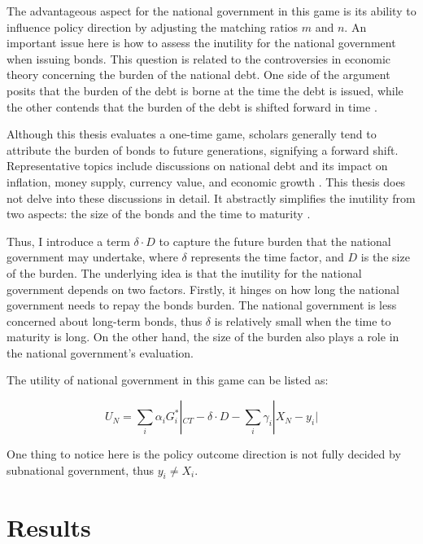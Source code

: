 \documentclass[man]{apa7}
\begin{document}
The advantageous aspect for the national government in this game is its ability to influence policy direction by adjusting the matching ratios $m$ and $n$. An important issue here is how to assess the inutility for the national government when issuing bonds. This question is related to the controversies in economic theory concerning the burden of the national debt. One side of the argument posits that the burden of the debt is borne at the time the debt is issued, while the other contends that the burden of the debt is shifted forward in time \parencite{modigliani1961long, holcombe1981national}.

Although this thesis evaluates a one-time game, scholars generally tend to attribute the burden of bonds to future generations, signifying a forward shift. Representative topics include discussions on national debt and its impact on inflation, money supply, currency value, and economic growth \parencite{cochrane2011inflation, aizenman2011using, hamburger1981deficits, panizza2014public, lucas1983optimal}. This thesis does not delve into these discussions in detail. It abstractly simplifies the inutility from two aspects: the size of the bonds and the time to maturity \parencite{diamond1965national, modigliani1961long, fullwiler2020interest}.%

Thus, I introduce a term $\delta \cdot D$ to capture the future burden that the national government may undertake, where $\delta$ represents the time factor, and $D$ is the size of the burden. The underlying idea is that the inutility for the national government depends on two factors. Firstly, it hinges on how long the national government needs to repay the bonds burden. The national government is less concerned about long-term bonds, thus $\delta$ is relatively small when the time to maturity is long. On the other hand, the size of the burden also plays a role in the national government's evaluation.%

The utility of national government in this game can be listed as:

\begin{equation}
  U_N=\sum_i \alpha_iG_i^*|_{CT}-\delta \cdot D-\sum_i \gamma_i |X_N-y_i|
\end{equation}

One thing to notice here is the policy outcome direction is not fully decided by subnational government, thus $y_i\neq X_i$.


\section{Results}
\end{document}
